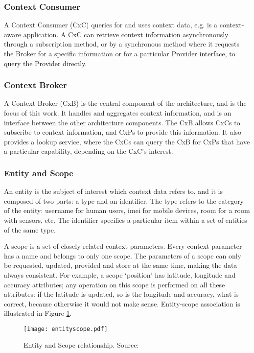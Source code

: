 \subsubsection{Context Consumer}
A Context Consumer (CxC) queries for and uses context data, e.g. is a context-aware application. A CxC can retrieve context information asynchronously through a subscription method, or by a synchronous method where it requests the Broker for a specific information or for a particular Provider interface, to query the Provider directly.

\subsubsection{Context Broker}
A Context Broker (CxB) is the central component of the architecture, and is the focus of this work. It handles and aggregates context information, and is an interface between the other architecture components. The CxB allows CxCs to subscribe to context information, and CxPs to provide this information. It also provides a lookup service, where the CxCs can query the CxB for CxPs that have a particular capability, depending on the CxC’s interest.

\subsubsection{Entity and Scope}
An entity is the subject of interest which context data refers to, and it is composed of two parts: a type and an identifier. The type refers to the category of the entity: username for human users, imei for mobile devices, room for a room with sensors, etc. The identifier specifies a particular item within a set of entities of the same type.

A scope is a set of closely related context parameters. Every context parameter has a name and belongs to only one scope. The parameters of a scope can only be requested, updated, provided and store at the same time, making the data always consistent. For example, a scope ‘position’ has latitude, longitude and accuracy attributes; any operation on this scope is performed on all these attributes: if the latitude is updated, so is the longitude and accuracy, what is correct, because otherwise it would not make sense. Entity-scope association is illustrated in Figure \ref{fig:entityscope}. \par

\begin{figure}[H]
	\centering
	\texttt{[image: entityscope.pdf]}
	\caption{Entity and Scope relationship. Source: \cite{knappmeyer2010contextml}}
	\label{fig:entityscope}
	
\end{figure}

